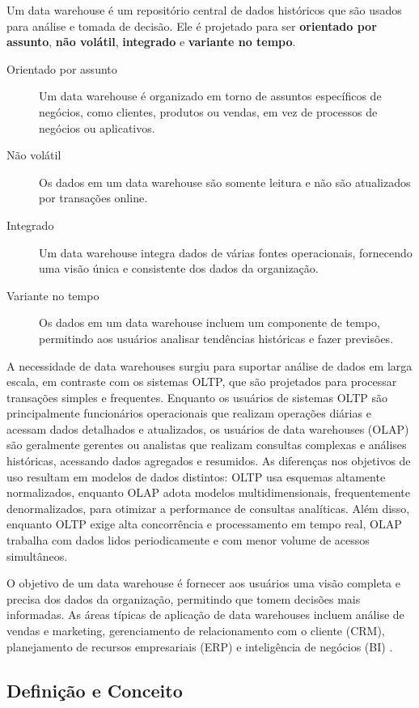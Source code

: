 Um data warehouse é um repositório central de dados históricos que são usados para análise e tomada de decisão. Ele 
é projetado para ser \textbf{orientado por assunto}, \textbf{não volátil}, \textbf{integrado} e \textbf{variante no tempo}.
\begin{description} 
    \item[Orientado por assunto] Um data warehouse é organizado em torno de assuntos específicos de negócios, como clientes, produtos ou vendas, em vez de processos de negócios ou aplicativos.
    \item[Não volátil] Os dados em um data warehouse são somente leitura e não são atualizados por transações online.
    \item[Integrado] Um data warehouse integra dados de várias fontes operacionais, fornecendo uma visão única e consistente dos dados da organização.
    \item[Variante no tempo] Os dados em um data warehouse incluem um componente de tempo, permitindo aos usuários analisar tendências históricas e fazer previsões.
\end{description}
A necessidade de data warehouses surgiu para suportar análise de dados em larga escala, em contraste com os sistemas 
OLTP, que são projetados para processar transações simples e frequentes. Enquanto os usuários de sistemas OLTP são 
principalmente funcionários operacionais que realizam operações diárias e acessam dados detalhados e atualizados, 
os usuários de data warehouses (OLAP) são geralmente gerentes ou analistas que realizam consultas complexas e análises 
históricas, acessando dados agregados e resumidos. As diferenças nos objetivos de uso resultam em modelos de dados 
distintos: OLTP usa esquemas altamente normalizados, enquanto OLAP adota modelos multidimensionais, frequentemente 
denormalizados, para otimizar a performance de consultas analíticas. Além disso, enquanto OLTP exige alta concorrência 
e processamento em tempo real, OLAP trabalha com dados lidos periodicamente e com menor volume de acessos simultâneos.

O objetivo de um data warehouse é fornecer aos usuários uma visão completa e precisa dos dados da organização, permitindo 
que tomem decisões mais informadas. As áreas típicas de aplicação de data warehouses incluem análise de vendas e marketing, 
gerenciamento de relacionamento com o cliente (CRM), planejamento de recursos empresariais (ERP) e inteligência de negócios (BI) \cite{nambiar2022overview, vaisman2014data}.

\subsection{Definição e Conceito}

